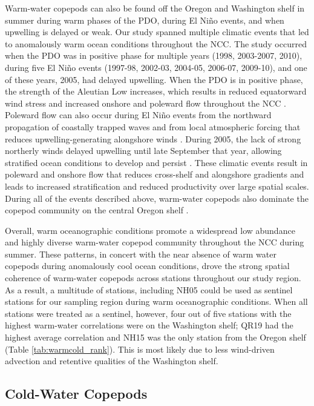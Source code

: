 \documentclass[preprint, authoryear, 12pt]{elsarticle}
\begin{document}
Warm-water copepods can also be found off the Oregon and Washington shelf in summer during warm phases of the PDO, during El Niño events, and when upwelling is delayed or weak. Our study spanned multiple climatic events that led to anomalously warm ocean conditions throughout the NCC.  The study occurred when the PDO was in positive phase for multiple years (1998, 2003-2007, 2010), during five El Niño events (1997-98, 2002-03, 2004-05, 2006-07, 2009-10), and one of these years, 2005, had delayed upwelling. When the PDO is in positive phase, the strength of the Aleutian Low increases, which results in reduced equatorward wind stress and increased onshore and poleward flow throughout the NCC \citep{mantua1997pacific}. Poleward flow can also occur during El Niño events from the northward propagation of coastally trapped waves and from local atmospheric forcing that reduces upwelling-generating alongshore winds \citep{hermann2009comparison, di2013double, frischknecht2017local}. During 2005, the lack of strong northerly winds delayed upwelling until late September that year, allowing stratified ocean conditions to develop and persist \citep{kosro2006physical}. These climatic events result in poleward and onshore flow that reduces cross-shelf and alongshore gradients and leads to increased stratification and reduced productivity over large spatial scales. During all of the events described above, warm-water copepods also dominate the copepod community on the central Oregon shelf \citep{keister2011zooplankton, fisher2015impact}. 

Overall, warm oceanographic conditions promote a widespread low abundance and highly diverse warm-water copepod community throughout the NCC during summer. These patterns, in concert with the near absence of warm water copepods during anomalously cool ocean conditions, drove the strong spatial coherence of warm-water copepods across stations throughout our study region.  As a result, a multitude of stations, including NH05 could be used as sentinel stations for our sampling region during warm oceanographic conditions.  When all stations were treated as a sentinel, however, four out of five stations with the highest warm-water correlations were on the Washington shelf; QR19 had the highest average correlation and NH15 was the only station from the Oregon shelf (Table \ref{tab:warmcold_rank}). This is most likely due to less wind-driven advection and retentive qualities of the Washington shelf.

\subsection{Cold-Water Copepods}
\end{document}
